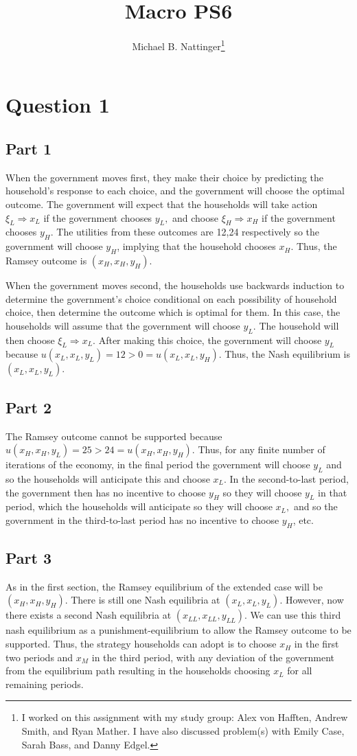 \documentclass[11pt]{article} %
\title{Macro PS6}
\author{Michael B. Nattinger\footnote{I worked on this assignment with my study group: Alex von Hafften, Andrew Smith, and Ryan Mather. I have also discussed problem(s) with Emily Case, Sarah Bass, and Danny Edgel.}}
\begin{document}
\maketitle

\section{Question 1}
\subsection{Part 1}
When the government moves first, they make their choice by predicting the household's response to each choice, and the government will choose the optimal outcome. The government will expect that the households will take action $\xi_L \Rightarrow x_L$ if the government chooses $y_L,$ and choose $\xi_H \Rightarrow x_H$ if the government chooses $y_H$. The utilities from these outcomes are 12,24 respectively so the government will choose $y_H$, implying that the household chooses $x_H$. Thus, the Ramsey outcome is $(x_H,x_H,y_H)$.

When the government moves second, the households use backwards induction to determine the government's choice conditional on each possibility of household choice, then determine the outcome which is optimal for them. In this case, the households will assume that the government will choose $y_L$. The household will then choose $\xi_L \Rightarrow x_L$. After making this choice, the government will choose $y_L$ because $u(x_L,x_L,y_L)=12>0 = u(x_L,x_L,y_H)$. Thus, the Nash equilibrium is $(x_L,x_L,y_L).$
\subsection{Part 2}
The Ramsey outcome cannot be supported because $u(x_H,x_H,y_L) = 25>24 = u(x_H,x_H,y_H)$. Thus, for any finite number of iterations of the economy, in the final period the government will choose $y_L$ and so the households will anticipate this and choose $x_L$. In the second-to-last period, the government then has no incentive to choose $y_H$ so they will choose $y_L$ in that period, which the households will anticipate so they will choose $x_L,$ and so the government in the third-to-last period has no incentive to choose $y_H$, etc.
\subsection{Part 3}
As in the first section, the Ramsey equilibrium of the extended case will be $(x_H,x_H,y_H)$. There is still one Nash equilibria at $(x_L,x_L,y_L).$ However, now there exists a second Nash equilibria at $(x_{LL},x_{LL},y_{LL}).$ We can use this third nash equilibrium as a punishment-equilibrium to allow the Ramsey outcome to be supported. Thus, the strategy households can adopt is to choose $x_H$ in the first two periods and $x_M$ in the third period, with any deviation of the government from the equilibrium path resulting in the households choosing $x_L$ for all remaining periods.
\end{document}
